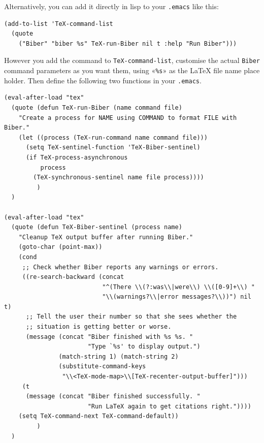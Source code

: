 \documentclass{ltxdockit}
\begin{document}
\noindent Alternatively, you can add it directly in lisp to your \verb+.emacs+ like
this:

\begin{verbatim}
(add-to-list 'TeX-command-list
  (quote
    ("Biber" "biber %s" TeX-run-Biber nil t :help "Run Biber")))
\end{verbatim}

\noindent However you add the command to \verb+TeX-command-list+, customise the
actual \verb+Biber+ command parameters as you want them, using «\verb+%s+» as
the LaTeX file name place holder. Then define the following two functions
in your \verb+.emacs+.

\small
\begin{verbatim}
(eval-after-load "tex"
  (quote (defun TeX-run-Biber (name command file)
    "Create a process for NAME using COMMAND to format FILE with Biber." 
    (let ((process (TeX-run-command name command file)))
      (setq TeX-sentinel-function 'TeX-Biber-sentinel)
      (if TeX-process-asynchronous
          process
        (TeX-synchronous-sentinel name file process))))
         )
  )

(eval-after-load "tex"
  (quote (defun TeX-Biber-sentinel (process name)
    "Cleanup TeX output buffer after running Biber."
    (goto-char (point-max))
    (cond
     ;; Check whether Biber reports any warnings or errors.
     ((re-search-backward (concat
                           "^(There \\(?:was\\|were\\) \\([0-9]+\\) "
                           "\\(warnings?\\|error messages?\\))") nil t)
      ;; Tell the user their number so that she sees whether the
      ;; situation is getting better or worse.
      (message (concat "Biber finished with %s %s. "
                       "Type `%s' to display output.")
               (match-string 1) (match-string 2)
               (substitute-command-keys
                "\\<TeX-mode-map>\\[TeX-recenter-output-buffer]")))
     (t
      (message (concat "Biber finished successfully. "
                       "Run LaTeX again to get citations right."))))
    (setq TeX-command-next TeX-command-default))
         )
  )
\end{verbatim}
\normalsize
\end{document}
